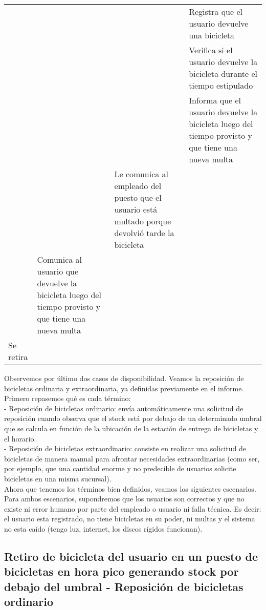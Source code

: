 \documentclass[a4paper, 11pt, spanish]{article}
\begin{document}
\begin{tabular}{|p{3cm}|p{4cm}|p{4cm}|p{4cm}|}
& & & Registra que el usuario devuelve una bicicleta \\ \cline{1-4}
& & & Verifica si el usuario devuelve la bicicleta durante el tiempo estipulado \\ \cline{1-4}
& & & Informa que el usuario devuelve la bicicleta luego del tiempo provisto y que tiene una nueva multa \\ \cline{1-4}
& & Le comunica al empleado del puesto que el usuario está multado porque devolvió tarde la bicicleta & \\ \cline{1-4}
& Comunica al usuario que devuelve la bicicleta luego del tiempo provisto y que tiene una nueva multa & & \\ \cline{1-4}
Se retira& & & \\ \cline{1-4}
\end{tabular}

\endgroup


\vspace*{1cm}

Observemos por último dos casos de disponibilidad. Veamos la reposición de bicicletas ordinaria y extraordinaria, ya definidas previamente en el informe.\\

Primero repasemos qué es cada término:\\
- Reposición de bicicletas ordinario: envía automáticamente una solicitud de reposición cuando observa que el stock está por debajo de un determinado umbral que se calcula en función de la ubicación de la estación de entrega de bicicletas y el horario.\\
- Reposición de bicicletas extraordinario: consiste en realizar una solicitud de bicicletas de manera manual para afrontar necesidades extraordinarias (como ser, por ejemplo, que una cantidad enorme y no predecible de usuarios solicite bicicletas en una misma sucursal).\\

Ahora que tenemos los términos bien definidos, veamos los siguientes escenarios.
Para ambos escenarios, supondremos que los usuarios son correctos y que no existe ni error humano por parte del empleado o usuario ni falla técnica. Es decir: el usuario esta registrado, no tiene bicicletas en su poder, ni multas y el sistema no esta caído (tengo luz, internet, los discos rígidos funcionan).\\

\subsection{Retiro de bicicleta del usuario en un puesto de bicicletas en hora pico generando stock por debajo del umbral - Reposición de bicicletas ordinario}
\end{document}
